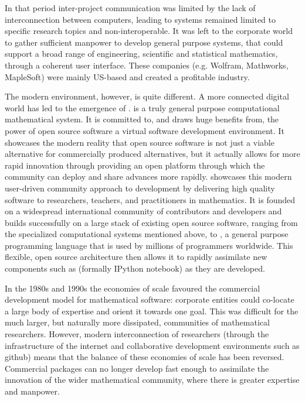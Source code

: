 In that period inter-project communication was limited by the lack of
interconnection between computers, leading to systems remained limited
to specific research topics and non-interoperable. It was left to the
corporate world to gather sufficient manpower to develop general
purpose systems, that could support a broad range of engineering,
scientific and statistical mathematics, through a coherent user
interface. These companies (e.g. Wolfram, Mathworks, MapleSoft) were
mainly US-based and created a profitable industry.

The modern environment, however, is quite different. A more connected
digital world has led to the emergence of \Sage. \Sage is a truly
general purpose computational mathematical system. It is committed to,
and draws huge benefits from, the power of open source software a
virtual software development environment. It showcases the modern
reality that open source software is not just a viable alternative for
commercially produced alternatives, but it actually allows for more
rapid innovation through providing an open platform through which the
community can deploy and share advances more rapidly. \Sage showcases
this modern user-driven community approach to development by
delivering high quality software to researchers, teachers, and
practitioners in mathematics. It is founded on a widespread
international community of contributors and developers and builds
successfully on a large stack of existing open source software,
ranging from the specialized computational systems mentioned above, to
\Python, a general purpose programming language that is used by
millions of programmers worldwide. This flexible, open source
architecture then allows it to rapidly assimilate new components such
as \Jupyter (formally IPython notebook) as they are developed.

In the 1980s and 1990s the economies of scale favoured the commercial development model for mathematical software: corporate entities could co-locate a large body of expertise and orient it towards one goal. This was difficult for the much larger, but naturally more dissipated, communities of mathematical researchers. However, modern interconnection of researchers (through the infrastructure of the internet and collaborative development environments such as github) means that the balance of these economies of scale has been reversed. Commercial packages can no longer develop fast enough to assimilate the innovation of the wider mathematical community, where there is greater expertise and manpower.

